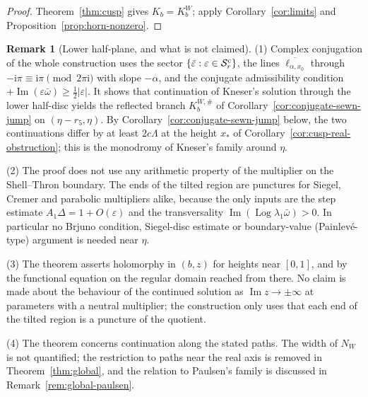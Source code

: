 \documentclass[11pt]{amsart}
\theoremstyle{definition}
\newtheorem{remark}[theorem]{Remark}
\newcommand{\Kk}{K}
\newcommand{\ii}{\mathrm{i}}
\begin{document}
\begin{proof}
Theorem~\ref{thm:cusp} gives $\Kk_b=\Kk^W_b$; apply Corollary~\ref{cor:limits}
and Proposition~\ref{prop:horn-nonzero}.
\end{proof}

\begin{remark}[Lower half-plane, and what is not claimed]\label{rem:cusp}
(1) Complex conjugation of the whole construction uses the sector
$\{\bar\varepsilon:\varepsilon\in\mathcal S^{\rm c}_r\}$, the lines $\overline{\ell_{\alpha,x_0}}$ through
$-\ii\pi\equiv\ii\pi\pmod{2\pi\ii}$ with slope $-\alpha$, and the conjugate admissibility
condition $+\operatorname{Im}(\varepsilon\bar\omega)\ge\tfrac12|\varepsilon|$.  It shows that continuation of
Kneser's solution through the lower half-disc yields the reflected branch
$\Kk^{W,\#}_b$ of Corollary~\ref{cor:conjugate-sewn-jump} on $(\eta-r_5,\eta)$.  By Corollary~\ref{cor:conjugate-sewn-jump} below, the two continuations differ
by at least $2c\Lambda$ at the height $x_*$ of
Corollary~\ref{cor:cusp-real-obstruction}; this is the monodromy of Kneser's family
around $\eta$.

(2) The proof does not use any arithmetic property of the multiplier on the
Shell--Thron boundary.  The ends of the tilted region are punctures for
Siegel, Cremer and parabolic multipliers alike, because the only inputs are
the step estimate $A_1\Delta=1+O(\varepsilon)$ and the transversality
$\operatorname{Im}(\operatorname{Log}\lambda_1\bar\omega)>0$.  In particular no
Brjuno condition, Siegel-disc estimate or boundary-value (Painlev\'e-type)
argument is needed near $\eta$.

(3) The theorem asserts holomorphy in $(b,z)$ for heights near $[0,1]$, and
by the functional equation on the regular domain reached from there.  No
claim is made about the behaviour of the continued solution as
$\operatorname{Im}z\to\pm\infty$ at parameters with a neutral multiplier; the
construction only uses that each end of the tilted region is a puncture of
the quotient.

(4) The theorem concerns continuation along the stated paths.  The width of
$N_W$ is not quantified; the restriction to paths near the real axis is
removed in Theorem~\ref{thm:global}, and the relation to Paulsen's family is
discussed in Remark~\ref{rem:global-paulsen}.
\end{remark}
\end{document}
